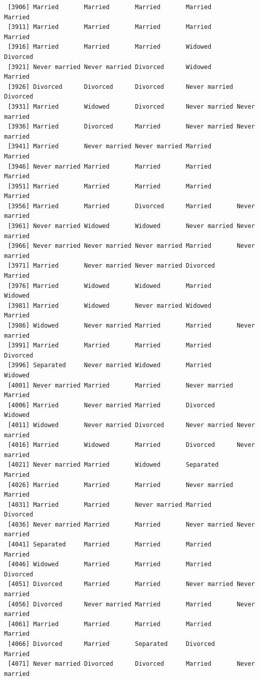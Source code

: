\documentclass[
  letterpaper,
  DIV=11,
  numbers=noendperiod,
  oneside]{scrartcl}
\begin{document}
\begin{verbatim}
 [3906] Married       Married       Married       Married       Married      
 [3911] Married       Married       Married       Married       Married      
 [3916] Married       Married       Married       Widowed       Divorced     
 [3921] Never married Never married Divorced      Widowed       Married      
 [3926] Divorced      Divorced      Divorced      Never married Divorced     
 [3931] Married       Widowed       Divorced      Never married Never married
 [3936] Married       Divorced      Married       Never married Never married
 [3941] Married       Never married Never married Married       Married      
 [3946] Never married Married       Married       Married       Married      
 [3951] Married       Married       Married       Married       Married      
 [3956] Married       Married       Divorced      Married       Never married
 [3961] Never married Widowed       Widowed       Never married Never married
 [3966] Never married Never married Never married Married       Never married
 [3971] Married       Never married Never married Divorced      Married      
 [3976] Married       Widowed       Widowed       Married       Widowed      
 [3981] Married       Widowed       Never married Widowed       Married      
 [3986] Widowed       Never married Married       Married       Never married
 [3991] Married       Married       Married       Married       Divorced     
 [3996] Separated     Never married Widowed       Married       Widowed      
 [4001] Never married Married       Married       Never married Married      
 [4006] Married       Never married Married       Divorced      Widowed      
 [4011] Widowed       Never married Divorced      Never married Never married
 [4016] Married       Widowed       Married       Divorced      Never married
 [4021] Never married Married       Widowed       Separated     Married      
 [4026] Married       Married       Married       Never married Married      
 [4031] Married       Married       Never married Married       Divorced     
 [4036] Never married Married       Married       Never married Never married
 [4041] Separated     Married       Married       Married       Married      
 [4046] Widowed       Married       Married       Married       Divorced     
 [4051] Divorced      Married       Married       Never married Never married
 [4056] Divorced      Never married Married       Married       Never married
 [4061] Married       Married       Married       Married       Married      
 [4066] Divorced      Married       Separated     Divorced      Married      
 [4071] Never married Divorced      Divorced      Married       Never married

\end{verbatim}
\end{document}
